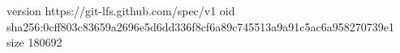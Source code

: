 version https://git-lfs.github.com/spec/v1
oid sha256:0cff803c83659a2696e5d6dd336f8cf6a89c745513a9a91c5ac6a958270739e1
size 180692
